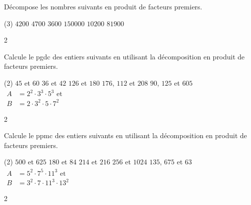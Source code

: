 \documentclass[a4paper,12pt]{report}
\begin{document}
\begin{exo}{ %
    Décompose les nombres suivants en produit de facteurs premiers.
    \begin{tasks}[label-width = 1em ,item-indent = 2em ,before-skip = -0.4em, after-skip = -0.4em , label-offset=0.666em,after-item-skip = 0.3em](3)
    \task $4200$
    \task $4700$
    \task $3600$
    \task $150000$
    \task $10200$
    \task $81900$
    \end{tasks}
}{2}\end{exo}








\begin{exo}{
    Calcule le pgdc des entiers suivants en utilisant la décomposition en produit de facteurs premiers.

    \begin{tasks}[label-width = 1em ,item-indent = 2em ,before-skip = -0.4em, after-skip = -0.4em , label-offset=0.666em,after-item-skip = 0.3em](2)
    \task $45$ et $60$
    \task $36$ et $42$
    \task $126$ et $180$
    \task $176$, $112$ et $208$
    \task $90$, $125$ et $605$
    \task $\begin{aligned}
		    A&=2^2\cdot3^3\cdot5^3 \text{ et}\\
		    B&= 2\cdot3^2\cdot5\cdot7^2
	\end{aligned}$
\end{tasks}
}{2}\end{exo}


\begin{exo}{
Calcule le ppmc des entiers suivants en utilisant la décomposition en produit de facteurs premiers.



\begin{tasks}[label-width = 1em ,item-indent = 2em ,before-skip = -0.4em, after-skip = -0.4em , label-offset=0.666em,after-item-skip = 0.3em](2)
    \task $500$ et $625$
    \task $180$ et $84$
    \task $214$ et $216$
    \task $256$ et $1024$
    \task $135$, $675$ et $63$
    \task $\begin{aligned}A &= 5^2\cdot7^5\cdot11^3 \text{ et}\\ B&= 3^2\cdot7\cdot11^3\cdot13^2
	    \end{aligned}$
\end{tasks}
}{2}\end{exo}
\end{document}
